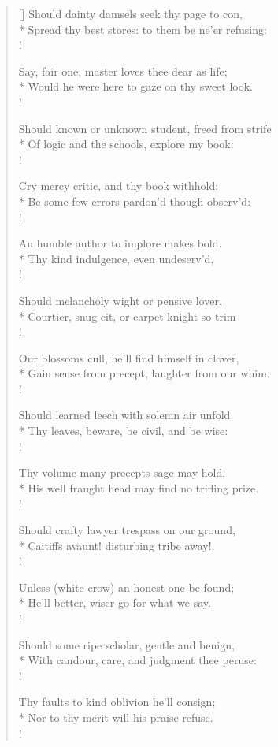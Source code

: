 \begin{verse}[\versewidth]
Should dainty damsels seek thy page to con,\\*
Spread thy best stores: to them be ne'er refusing:\\!

Say, fair one, master loves thee dear as life;\\*
Would he were here to gaze on thy sweet look.\\!

Should known or unknown student, freed from strife\\*
Of logic and the schools, explore my book:\\!

Cry mercy critic, and thy book withhold:\\*
Be some few errors pardon'd though observ'd:\\!

An humble author to implore makes bold.\\*
Thy kind indulgence, even undeserv'd,\\!

Should melancholy wight or pensive lover,\\*
Courtier, snug cit, or carpet knight so trim\\!

Our blossoms cull, he'll find himself in clover,\\*
Gain sense from precept, laughter from our whim.\\!

Should learned leech with solemn air unfold\\*
Thy leaves, beware, be civil, and be wise:\\!

Thy volume many precepts sage may hold,\\*
His well fraught head may find no trifling prize.\\!

Should crafty lawyer trespass on our ground,\\*
Caitiffs avaunt! disturbing tribe away!\\!

Unless (white crow) an honest one be found;\\*
He'll better, wiser go for what we say.\\!

Should some ripe scholar, gentle and benign,\\*
With candour, care, and judgment thee peruse:\\!

Thy faults to kind oblivion he'll consign;\\*
Nor to thy merit will his praise refuse.\\!


\end{verse}

